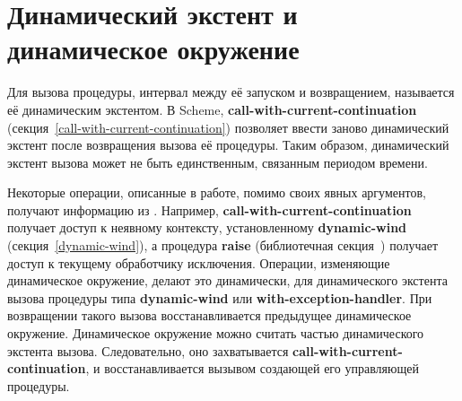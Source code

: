\section{Динамический экстент и динамическое окружение}\vspace{-1mm}
\label{dynamicenvironmentsection}

Для вызова процедуры, интервал между её запуском и возвращением, называется её 
{динамическим экстентом}. В Scheme, {\cf\bfseries call-with-current-continuation}
(секция~\ref{call-with-current-continuation}) позволяет ввести заново динамический экстент после
возвращения вызова её процедуры. Таким образом, динамический экстент вызова может не быть
единственным, связанным периодом времени.

Некоторые операции, описанные в работе, помимо своих явных аргументов, получают информацию
из . Например, {\bfseries\cf
  call-\hp{}with-\hp{}current-\hp{}continuation} получает доступ к неявному контексту,
установленному {\bfseries\cf dynamic-wind} (секция~\ref{dynamic-wind}), а процедура {\bfseries\cf raise}
(библиотечная секция~) получает доступ к текущему
обработчику исключения. Операции, изменяющие динамическое окружение, делают
это динамически, для динамического экстента вызова процедуры типа {\bfseries\cf dynamic-wind} или
{\bfseries\cf with-exception-handler}. При возвращении такого вызова восстанавливается предыдущее динамическое
окружение. Динамическое окружение можно считать частью
динамического экстента вызова. Следовательно, оно захватывается {\bfseries\cf call-with-current-continuation},
и восстанавливается вызывом создающей его управляющей процедуры.\vspace{-2mm}


